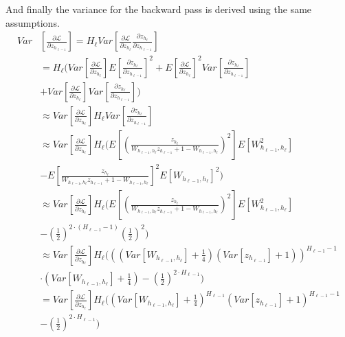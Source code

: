 And finally the variance for the backward pass is derived using the same assumptions.
\begin{equation}
\begin{aligned}
Var&\left[\frac{\partial \mathcal{L}}{\partial z_{h_{\ell-1}}}\right] = H_\ell Var\left[\frac{\partial \mathcal{L}}{\partial z_{h_\ell}} \frac{\partial z_{h_\ell}}{\partial z_{h_{\ell-1}}}\right] \\
&= H_\ell \Bigg(Var\left[\frac{\partial \mathcal{L}}{\partial z_{h_\ell}}\right] E\left[\frac{\partial z_{h_\ell}}{\partial z_{h_{\ell-1}}}\right]^2 + E\left[\frac{\partial \mathcal{L}}{\partial z_{h_\ell}}\right]^2 Var\left[\frac{\partial z_{h_\ell}}{\partial z_{h_{\ell-1}}}\right] \\
&+ Var\left[\frac{\partial \mathcal{L}}{\partial z_{h_\ell}}\right] Var\left[\frac{\partial z_{h_\ell}}{\partial z_{h_{\ell-1}}}\right]\Bigg) \\
&\approx Var\left[\frac{\partial \mathcal{L}}{\partial z_{h_\ell}}\right] H_\ell Var\left[\frac{\partial z_{h_\ell}}{\partial z_{h_{\ell-1}}}\right] \\
&\approx Var\left[\frac{\partial \mathcal{L}}{\partial z_{h_\ell}}\right] H_\ell \Bigg( E\left[\left(\frac{z_{h_\ell}}{W_{h_{\ell-1},h_\ell} z_{h_{\ell-1}} + 1 - W_{h_{\ell-1},h_\ell}}\right)^2\right] E[W_{h_{\ell-1},h_\ell}^2] \\
&- E\left[\frac{z_{h_\ell}}{W_{h_{\ell-1},h_\ell} z_{h_{\ell-1}} + 1 - W_{h_{\ell-1},h_\ell}}\right]^2 E[W_{h_{\ell-1},h_\ell}]^2 \Bigg) \\
&\approx Var\left[\frac{\partial \mathcal{L}}{\partial z_{h_\ell}}\right] H_\ell \Bigg( E\left[\left(\frac{z_{h_\ell}}{W_{h_{\ell-1},h_\ell} z_{h_{\ell-1}} + 1 - W_{h_{\ell-1},h_\ell}}\right)^2\right] E[W_{h_{\ell-1},h_\ell}^2] \\
&- \left(\frac{1}{2}\right)^{2 \cdot \left(H_{\ell-1}-1\right)} \left(\frac{1}{2}\right)^2\Bigg) \\
&\approx Var\left[\frac{\partial \mathcal{L}}{\partial z_{h_\ell}}\right] H_\ell \Bigg( \left(\left(Var[W_{h_{\ell-1},h_\ell}] + \frac{1}{4}\right) \left(Var[z_{h_{\ell-1}}] + 1\right)\right)^{H_{\ell-1}-1} \\
&\cdot \left(Var[W_{h_{\ell-1},h_\ell}] + \frac{1}{4}\right) - \left(\frac{1}{2}\right)^{2 \cdot H_{\ell-1}}\Bigg) \\
&= Var\left[\frac{\partial \mathcal{L}}{\partial z_{h_\ell}}\right] H_\ell \Bigg( \left(Var[W_{h_{\ell-1},h_\ell}] + \frac{1}{4}\right)^{H_{\ell-1}} \left(Var[z_{h_{\ell-1}}] + 1\right)^{H_{\ell-1}-1} \\
&- \left(\frac{1}{2}\right)^{2 \cdot H_{\ell-1}}\Bigg)
\end{aligned}
\end{equation}

